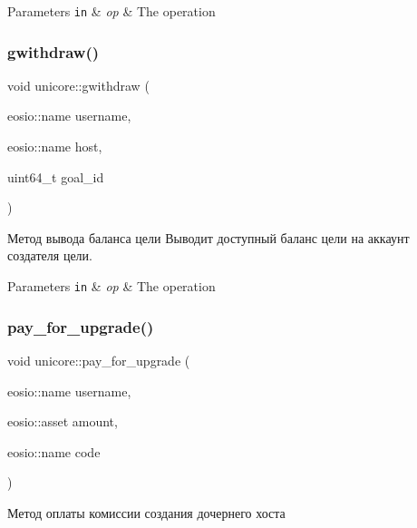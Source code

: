 \begin{DoxyParams}[1]{Parameters}
\mbox{\tt in}  & {\em op} & The operation \\
\hline
\end{DoxyParams}
\mbox{\label{classunicore_a4faa41a68505840e66f78e350412723c}} 
\subsubsection{\texorpdfstring{gwithdraw()}{gwithdraw()}}
{\footnotesize\ttfamily void unicore\+::gwithdraw (\begin{DoxyParamCaption}\item[{eosio\+::name}]{username,  }\item[{eosio\+::name}]{host,  }\item[{uint64\+\_\+t}]{goal\+\_\+id }\end{DoxyParamCaption})}



Метод вывода баланса цели Выводит доступный баланс цели на аккаунт создателя цели. 


\begin{DoxyParams}[1]{Parameters}
\mbox{\tt in}  & {\em op} & The operation \\
\hline
\end{DoxyParams}
\mbox{\label{classunicore_a4f4a69c310c073c6cf1ebf41f2c210e8}} 
\subsubsection{\texorpdfstring{pay\+\_\+for\+\_\+upgrade()}{pay\_for\_upgrade()}}
{\footnotesize\ttfamily void unicore\+::pay\+\_\+for\+\_\+upgrade (\begin{DoxyParamCaption}\item[{eosio\+::name}]{username,  }\item[{eosio\+::asset}]{amount,  }\item[{eosio\+::name}]{code }\end{DoxyParamCaption})\hspace{0.3cm}{\ttfamily [static]}}



Метод оплаты комиссии создания дочернего хоста 


